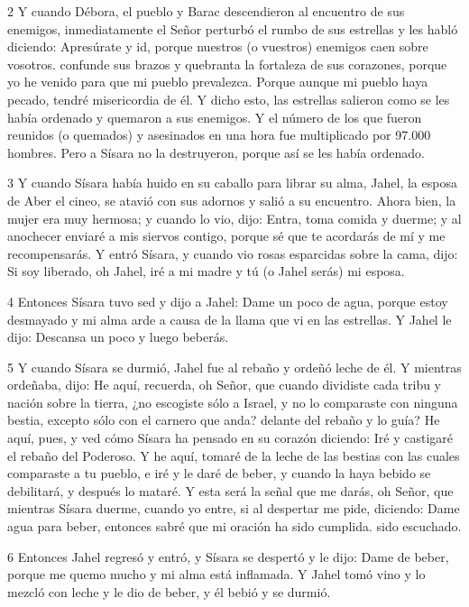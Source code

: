 \par 2 Y cuando Débora, el pueblo y Barac descendieron al encuentro de sus enemigos, inmediatamente el Señor perturbó el rumbo de sus estrellas y les habló diciendo: Apresúrate y id, porque nuestros (o vuestros) enemigos caen sobre vosotros. confunde sus brazos y quebranta la fortaleza de sus corazones, porque yo he venido para que mi pueblo prevalezca. Porque aunque mi pueblo haya pecado, tendré misericordia de él. Y dicho esto, las estrellas salieron como se les había ordenado y quemaron a sus enemigos. Y el número de los que fueron reunidos (o quemados) y asesinados en una hora fue multiplicado por 97.000 hombres. Pero a Sísara no la destruyeron, porque así se les había ordenado.

\par 3 Y cuando Sísara había huido en su caballo para librar su alma, Jahel, la esposa de Aber el cineo, se atavió con sus adornos y salió a su encuentro. Ahora bien, la mujer era muy hermosa; y cuando lo vio, dijo: Entra, toma comida y duerme; y al anochecer enviaré a mis siervos contigo, porque sé que te acordarás de mí y me recompensarás. Y entró Sísara, y cuando vio rosas esparcidas sobre la cama, dijo: Si soy liberado, oh Jahel, iré a mi madre y tú (o Jahel serás) mi esposa.

\par 4 Entonces Sísara tuvo sed y dijo a Jahel: Dame un poco de agua, porque estoy desmayado y mi alma arde a causa de la llama que vi en las estrellas. Y Jahel le dijo: Descansa un poco y luego beberás.

\par 5 Y cuando Sísara se durmió, Jahel fue al rebaño y ordeñó leche de él. Y mientras ordeñaba, dijo: He aquí, recuerda, oh Señor, que cuando dividiste cada tribu y nación sobre la tierra, ¿no escogiste sólo a Israel, y no lo comparaste con ninguna bestia, excepto sólo con el carnero que anda? delante del rebaño y lo guía? He aquí, pues, y ved cómo Sísara ha pensado en su corazón diciendo: Iré y castigaré el rebaño del Poderoso. Y he aquí, tomaré de la leche de las bestias con las cuales comparaste a tu pueblo, e iré y le daré de beber, y cuando la haya bebido se debilitará, y después lo mataré. Y esta será la señal que me darás, oh Señor, que mientras Sísara duerme, cuando yo entre, si al despertar me pide, diciendo: Dame agua para beber, entonces sabré que mi oración ha sido cumplida. sido escuchado.

\par 6 Entonces Jahel regresó y entró, y Sísara se despertó y le dijo: Dame de beber, porque me quemo mucho y mi alma está inflamada. Y Jahel tomó vino y lo mezcló con leche y le dio de beber, y él bebió y se durmió.

